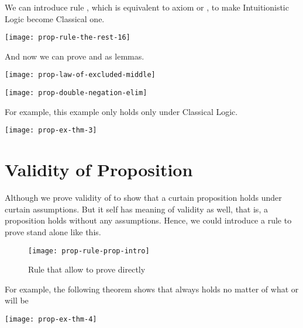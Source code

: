 \documentclass[master.tex]{subfiles}
\begin{document}
We can introduce rule , which is equivalent to
axiom  or , to make
Intuitionistic Logic become Classical one.

\begin{center}
\texttt{[image: prop-rule-the-rest-16]}
\end{center}

And now we can prove  and
 as lemmas.

\begin{center}
  \texttt{[image: prop-law-of-excluded-middle]}
\end{center}

\begin{center}
  \texttt{[image: prop-double-negation-elim]}
\end{center}

\hspace{1ex}

For example, this example only holds only under Classical Logic.

\hspace{1ex}

\begin{center}
  \texttt{[image: prop-ex-thm-3]}
\end{center}

\newpage

\section{Validity of Proposition}

Although we prove validity of  to show that a curtain proposition
holds under curtain assumptions. But  it self has meaning of validity
as well, that is, a proposition holds without any assumptions. Hence, we could
introduce a rule to prove stand alone  like this.

\begin{figure}[H]
    \centering
  \texttt{[image: prop-rule-prop-intro]}
\caption{Rule that allow to prove  directly}
\label{fig:prop-rule-prop-intro}
\end{figure}

For example, the following theorem shows that  always holds
no matter of what  or  will be

\begin{center}
  \texttt{[image: prop-ex-thm-4]}
\end{center}
\end{document}

